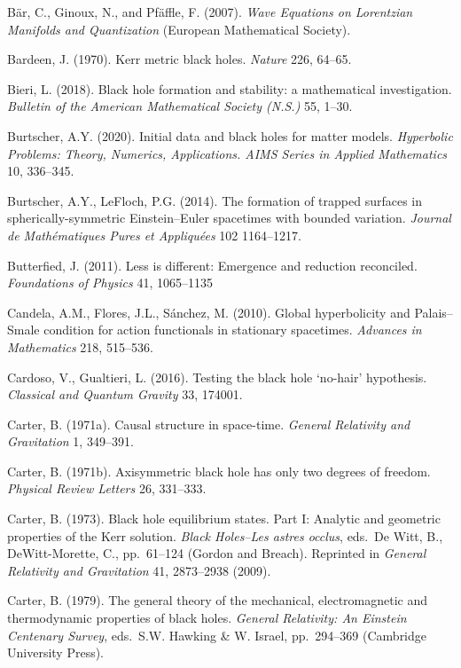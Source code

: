 \documentclass[11pt,a4paper]{article}
\begin{document}
\begin{small}
\begin{thebibliography}{99}
\item[]  B\"{a}r, C., Ginoux, N., and Pf\"{a}ffle, F. (2007). \emph{Wave Equations on Lorentzian Manifolds and Quantization}
(European Mathematical Society). 
\item[]  Bardeen, J. (1970). Kerr metric black holes. \emph{Nature} 226, 64--65.
\item[] Bieri, L. (2018). Black hole formation and stability: a mathematical investigation. \emph{Bulletin of the American Mathematical Society (N.S.)} 55, 1--30.
\item[] Burtscher, A.Y. (2020). Initial data and black holes for matter models. \emph{
Hyperbolic Problems: Theory, Numerics, Applications. AIMS Series in  Applied Mathematics}  10, 336--345.
\item[] Burtscher, A.Y.,  LeFloch, P.G. (2014). The formation of trapped surfaces in spherically-symmetric Einstein--Euler
spacetimes with bounded variation. \emph{Journal de Math\'{e}matiques Pures et Appliqu\'{e}es} 102 1164--1217.
\item[] Butterfied, J. (2011). Less is different: Emergence and reduction reconciled.
\emph{Foundations of Physics}  41, 1065--1135
\item[]  Candela, A.M.,  Flores, J.L., S\'{a}nchez, M.  (2010).
Global hyperbolicity and Palais--Smale condition for action functionals in stationary spacetimes.
\emph{Advances in Mathematics} 218, 515--536.
\item[]  Cardoso, V.,  Gualtieri, L. (2016). Testing the black hole `no-hair' hypothesis. \emph{Classical and Quantum Gravity}
33, 174001.
\item[] Carter, B. (1971a). Causal structure in space-time. \emph{General Relativity and Gravitation} 1, 349--391.
\item[] Carter, B. (1971b). Axisymmetric black hole has only two degrees of freedom. \emph{Physical Review
Letters} 26, 331--333.
\item[] Carter, B. (1973). Black hole equilibrium states. Part I: Analytic and geometric properties of the Kerr solution.
\emph{Black Holes--Les astres occlus}, eds.\  De Witt, B., DeWitt-Morette, C., pp.\ 61--124 (Gordon and Breach).
Reprinted in \emph{General Relativity and Gravitation} 41, 2873--2938 (2009).
\item[] Carter, B. (1979). The general theory of the mechanical, electromagnetic and thermodynamic properties of black holes.  \emph{General Relativity: An Einstein Centenary Survey}, eds.\ 
S.W. Hawking \& W. Israel, pp.\ 294--369 (Cambridge University Press). 

\end{thebibliography}
\end{small}
\end{document}
